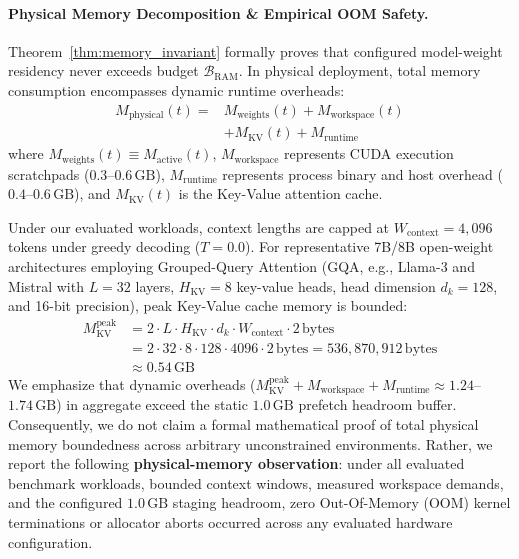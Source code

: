 \paragraph{Physical Memory Decomposition \& Empirical OOM Safety.}
Theorem~\ref{thm:memory_invariant} formally proves that configured model-weight residency never exceeds budget $\mathcal{B}_{\text{RAM}}$. In physical deployment, total memory consumption encompasses dynamic runtime overheads:
\begin{equation}
\begin{aligned}
M_{\text{physical}}(t) = & M_{\text{weights}}(t) + M_{\text{workspace}}(t) \\
&+ M_{\text{KV}}(t) + M_{\text{runtime}}
\end{aligned}
\label{eq:physical_memory_decomposition}
\end{equation}
where $M_{\text{weights}}(t) \equiv M_{\text{active}}(t)$, $M_{\text{workspace}}$ represents CUDA execution scratchpads ($0.3$--$0.6\,\text{GB}$), $M_{\text{runtime}}$ represents process binary and host overhead ($0.4$--$0.6\,\text{GB}$), and $M_{\text{KV}}(t)$ is the Key-Value attention cache.

Under our evaluated workloads, context lengths are capped at $W_{\text{context}} = 4,096$ tokens under greedy decoding ($T=0.0$). For representative 7B/8B open-weight architectures employing Grouped-Query Attention (GQA, e.g., Llama-3 and Mistral with $L=32$ layers, $H_{\text{KV}}=8$ key-value heads, head dimension $d_k=128$, and 16-bit precision), peak Key-Value cache memory is bounded:
\begin{equation}
\begin{aligned}
M_{\text{KV}}^{\text{peak}} &= 2 \cdot L \cdot H_{\text{KV}} \cdot d_k \cdot W_{\text{context}} \cdot 2\,\text{bytes} \\
&= 2 \cdot 32 \cdot 8 \cdot 128 \cdot 4096 \cdot 2\,\text{bytes} = 536,870,912\,\text{bytes} \\
&\approx 0.54\,\text{GB}
\end{aligned}
\end{equation}
We emphasize that dynamic overheads ($M_{\text{KV}}^{\text{peak}} + M_{\text{workspace}} + M_{\text{runtime}} \approx 1.24$--$1.74\,\text{GB}$) in aggregate exceed the static $1.0\,\text{GB}$ prefetch headroom buffer. Consequently, we do not claim a formal mathematical proof of total physical memory boundedness across arbitrary unconstrained environments. Rather, we report the following \textbf{physical-memory observation}: under all evaluated benchmark workloads, bounded context windows, measured workspace demands, and the configured $1.0\,\text{GB}$ staging headroom, zero Out-Of-Memory (OOM) kernel terminations or allocator aborts occurred across any evaluated hardware configuration.
